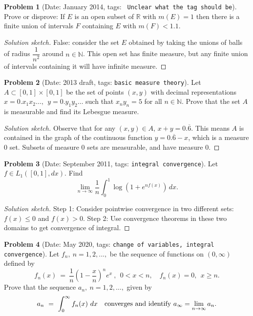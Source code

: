 \documentclass[11pt, notitlepage]{article}
\theoremstyle{definition}
\theoremstyle{definition}
\theoremstyle{definition}
\newtheorem{probstate}{Problem}
\theoremstyle{remark}
\newenvironment{problem}[2]{
    \begin{probstate}[Date: #1, tags: {\color{white} \texttt{#2}}]
}
{
  \end{probstate}
}
\newenvironment{sketch}{
    \begin{proof}[Solution sketch]
}
{
    \end{proof}
}
\newcommand{\R}{\mathbb{R}}
\newcommand{\N}{\mathbb{N}}
\begin{document}
\begin{problem}{January 2014}{\color{red} Unclear what the tag should be}
Prove or disprove:  If $E$ is an open subset of $\R$ with $m(E)=1$ then there is a finite union of intervals $F$ containing $E$ with $m(F)<1.1$.
\end{problem}
\begin{sketch}
False: consider the set $E$ obtained by taking the unions of balls of radius $\dfrac{1}{n^2}$ around $n \in \mathbb{N}$.
This open set has finite measure, but any finite union of intervals containing it will have infinite measure.
\end{sketch}

\begin{problem}{2013 draft}{basic measure theory}
Let $A \subset [0,1] \times [0,1]$ be the set of points $(x,y)$ with decimal representations $x=0.x_1 x_2 \ldots, \ \  y=0.y_1 y_2 \ldots$ such that  $x_n y_n=5$ for all $n \in \N$. Prove that the set $A$ is measurable and find its Lebesgue measure.
\end{problem}
\begin{sketch}
Observe that for any $(x,y) \in A$, $x+y = 0.\overline{6}$. This means $A$ is contained in the graph of the continuous function $y = 0.\overline{6} - x$, which is a measure $0$ set.
Subsets of measure $0$ sets are measurable, and have measure $0$.
\end{sketch}

\begin{problem}{September 2011}{integral convergence}
Let $f \in L_1([0,1], dx)$. Find
 \[
   \lim_{n \to \infty} \frac{1}{n}  \int_0^1 \log \left( 1+ e^{nf(x)} \right) \, dx.
 \]
\end{problem}
\begin{sketch}
Step 1: Consider pointwise convergence in two different sets: $f(x) \leq 0$ and $f(x) > 0$.
Step 2: Use convergence theorems in these two domains to get convergence of integral.
\end{sketch}

\begin{problem}{May 2020}{change of variables, integral convergence}
  Let $f_n, \ n=1,2,...,$ be the sequence of functions on $(0,\infty)$ defined by
$$
f_n(x) \ = \ \frac{1}{n}\left(1-\frac{x}{n}\right)^n e^{x} \ ,  \ \ 0<x<n, \quad f_n(x)=0, \ \ x\ge n.
$$
Prove that the sequence $a_n, \ n=1,2,\dots,$ given by
$$
a_n \ = \ \int_0^\infty f_n(x) \ dx \quad {\rm converges \ and \ identify \ } a_\infty=\lim_{n\to\infty} a_n.
$$
\end{problem}
\end{document}
